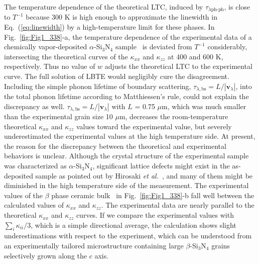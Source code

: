 \documentclass[twocolumn,amsmath,amssymb,a4paper,prb,superscriptaddress,floatfix]{revtex4-1}
\begin{document}
The temperature dependence of the theoretical LTC, induced by
$\tau_{\lambda\text{ph-ph}}$, is close to $T^{-1}$ because 300 K is high enough
to approximate the linewidth in Eq.~(\ref{eq:linewidth}) by a high-temperature
limit for these phases.  In Fig.~\ref{fig:Fig1_338}-a, the temperature
dependence of the experimental data of a chemically vapor-deposited
$\alpha$-Si$_3$N$_4$ sample~\cite{hirai} is deviated from $T^{-1}$
considerably, intersecting the theoretical curves of the $\kappa$$_{xx}$ and
$\kappa$$_{zz}$ at 400 and 600 K, respectively.  Thus no value of $w$ adjusts
the theoretical LTC to the experimental curve.  The full solution of LBTE would
negligibly cure the disagreement.  Including the simple phonon lifetime of
boundary scattering, $\tau_{\lambda,\text{bs}}=L/|\mathbf{v}_\lambda|$, into
the total phonon lifetime according to Matthiessen's rule, could not explain
the discrepancy as well.  $\tau_{\lambda,\text{bs}}=L/|\mathbf{v}_\lambda|$
with $L$ = 0.75 $\mu\text{m}$, which was much smaller than the experimental
grain size 10 $\mu\text{m}$, decreases the room-temperature theoretical
$\kappa$$_{xx}$ and $\kappa$$_{zz}$ values toward the experimental value, but
severely underestimated the experimental values at the high temperature side.
At present, the reason for the discrepancy between the theoretical and
experimental behaviors is unclear.  Although the crystal structure of the
experimental sample was characterized as $\alpha$-Si$_3$N$_4$, significant
lattice defects might exist in the as-deposited sample as pointed out by
Hirosaki {\it et al.}~\cite{hirosaki-md}, and many of them might be diminished
in the high temperature side of the measurement.
The experimental values of the $\beta$ phase ceramic bulk~\cite{hirosaki} in
Fig.~\ref{fig:Fig1_338}-b fall well between the calculated values of
$\kappa$$_{xx}$ and  $\kappa$$_{zz}$.  The experimental data are nearly
parallel to the theoretical $\kappa$$_{xx}$ and  $\kappa$$_{zz}$ curves.  If we
compare the experimental values with $\sum_i \kappa_{ii}/3$, which is a simple
directional average, the calculation shows slight underestimations with respect
to the experiment, which can be understood from an experimentally tailored
microstructure containing large $\beta$-Si$_3$N$_4$ grains selectively grown
along the $c$ axis.~\cite{hirosaki}
\end{document}
